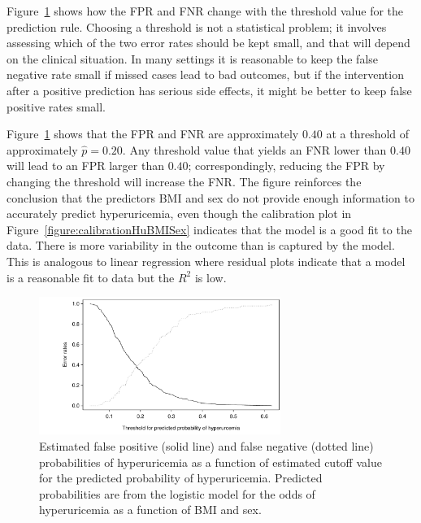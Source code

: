 Figure~\ref{figure:fprFNRByCutoffHuBMISex} shows how the FPR and FNR change with the threshold value for the prediction rule.  Choosing a threshold is not a statistical problem; it involves assessing which of the two error rates should be kept small, and that will depend on the clinical situation.  In many settings it is reasonable to keep the false negative rate small if missed cases lead to bad outcomes, but if the intervention after a positive prediction has serious side effects, it might be better to keep false positive rates small.   

Figure~\ref{figure:fprFNRByCutoffHuBMISex} shows that the FPR and FNR are approximately $0.40$ at a threshold of approximately $\hat{p} = 0.20$.  Any threshold value that yields an FNR lower than $0.40$ will lead to an FPR larger than $0.40$;  correspondingly, reducing the FPR by changing the threshold will increase the FNR. The figure reinforces the conclusion that the predictors BMI and sex do not provide enough information to accurately predict hyperuricemia, even though the calibration plot in Figure~\ref{figure:calibrationHuBMISex} indicates that the model is a good fit to the data.  There is more variability in the outcome than is captured by the model.  This is analogous to linear regression where residual plots indicate that a model is a reasonable fit to data but the $R^2$ is low.

\begin{figure}[!tbh]
  \centering
  \includegraphics[width=0.70\textwidth]
  {ch_logistic_regression_oi_biostat/figures/fprFNRByCutoffHuBMISex/fprFNRByCutoffHuBMISex.pdf}
    \caption{Estimated false positive (solid line) and false negative (dotted line) probabilities of hyperuricemia as a function of estimated cutoff value for the predicted probability of hyperuricemia.  Predicted probabilities are from the logistic model for the odds of hyperuricemia as a function of BMI and sex.}
    \label{figure:fprFNRByCutoffHuBMISex}
\end{figure}


